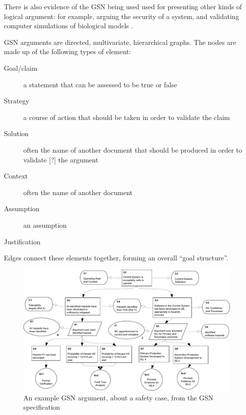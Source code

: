 There is also evidence of the GSN being used used for presenting other kinds of logical argument:
for example,
arguing the security of a system\cite{plop},
and validating computer simulations of biological models \cite{insilico}. 

GSN arguments are directed, multivariate, hierarchical graphs.
The nodes are made up of the following types of element:

\begin{description}

  \item[ Goal/claim ]
    a statement that can be assessed to be true or false

  \item[ Strategy]
    a course of action that should be taken in order to validate the claim
  
  \item[ Solution]
      often the name of another document that should be produced in order to validate [?] the argument 

  \item[ Context]
    often the name of another document

  \item[ Assumption]
    an assumption

  \item[ Justification]

\end{description}

Edges connect these elements together, forming an overall ``goal structure''. 

\begin{figure}
  \centering
  \includegraphics[width=\textwidth]{example_argument.pdf}
  \caption{An example GSN argument, about a safety case,
    from the GSN specification \cite{gsnstandard}}
  \label{fig:example}
\end{figure}




